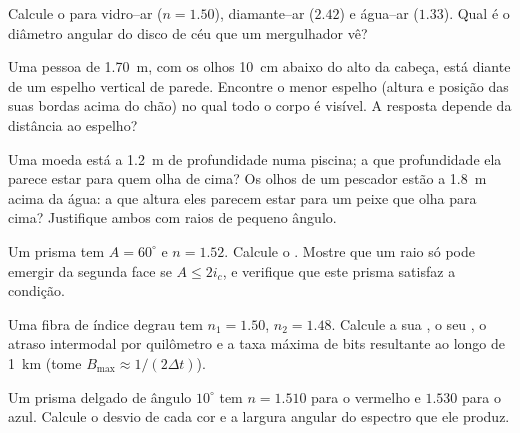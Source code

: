 \begin{exercise}[$\star$]\label{exo:b1:rays-reflection-refraction:3}
Calcule o  para vidro--ar ($n = 1.50$), diamante--ar
($2.42$) e água--ar ($1.33$). Qual é o diâmetro angular do
disco de céu que um mergulhador vê?
\end{exercise}

\begin{exercise}[$\star$]\label{exo:b1:rays-reflection-refraction:4}
Uma pessoa de \qty{1.70}{m}, com os olhos \qty{10}{cm} abaixo do alto da
cabeça, está diante de um espelho vertical de parede. Encontre o menor espelho
(altura e posição das suas bordas acima do chão) no qual todo o
corpo é visível. A resposta depende da distância ao espelho?
\end{exercise}

\begin{exercise}[$\star\star$]\label{exo:b1:rays-reflection-refraction:5}
Uma moeda está a \qty{1.2}{m} de profundidade numa piscina; a que profundidade ela parece
estar para quem olha de cima? Os olhos de um pescador estão a \qty{1.8}{m}
acima da água: a que altura eles parecem estar para um peixe que olha para cima? Justifique
ambos com raios de pequeno ângulo.
\end{exercise}

\begin{exercise}[$\star\star$]\label{exo:b1:rays-reflection-refraction:6}
Um prisma tem $A = 60^\circ$ e $n = 1.52$. Calcule o . Mostre que um raio só pode emergir da segunda face se
$A \leq 2 i_c$, e verifique que este prisma satisfaz a condição.
\end{exercise}

\begin{exercise}[$\star\star$]\label{exo:b1:rays-reflection-refraction:7}
Uma fibra de índice degrau tem $n_1 = 1.50$, $n_2 = 1.48$. Calcule a sua
, o seu , o atraso intermodal por
quilômetro e a taxa máxima de bits resultante ao longo de \qty{1}{km}
(tome $B_{\max} \approx 1/(2\Delta t)$).
\end{exercise}

\begin{exercise}[$\star\star$]\label{exo:b1:rays-reflection-refraction:8}
Um prisma delgado de ângulo $10^\circ$ tem $n = 1.510$ para o vermelho e $1.530$ para o
azul. Calcule o desvio de cada cor e a largura angular do
espectro que ele produz.
\end{exercise}

